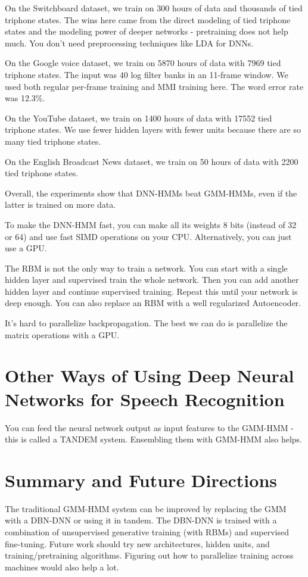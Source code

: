 \documentclass[a4paper]{article}
\begin{document}
On the Switchboard dataset, we train on 300 hours of data and thousands of
tied triphone states. The wins here came from the direct modeling of tied
triphone states and the modeling power of deeper networks - pretraining
does not help much. You don't need preprocessing techniques like LDA for DNNs.

On the Google voice dataset, we train on 5870 hours of data with 7969 tied
triphone states. The input was 40 log filter banks in an 11-frame window. We
used both regular per-frame training and MMI training here. The word error rate
was 12.3\%.

On the YouTube dataset, we train on 1400 hours of data with 17552 tied triphone
states. We use fewer hidden layers with fewer units because there are so many
tied triphone states.

On the English Broadcast News dataset, we train on 50 hours of data with 2200
tied triphone states.

Overall, the experiments show that DNN-HMMs beat GMM-HMMs, even if the latter is
trained on more data.

To make the DNN-HMM fast, you can make all its weights 8 bits (instead of 32 or
64) and use fast SIMD operations on your CPU. Alternatively, you can just use a
GPU.

The RBM is not the only way to train a network. You can start with a single
hidden layer and supervised train the whole network. Then you can add another
hidden layer and continue supervised training. Repeat this until your network
is deep enough. You can also replace an RBM with a well regularized Autoencoder.

It's hard to parallelize backpropagation. The best we can do is parallelize the
matrix operations with a GPU.

\section{Other Ways of Using Deep Neural Networks for Speech Recognition}
You can feed the neural network output as input features to the GMM-HMM - this
is called a TANDEM system. Ensembling them with GMM-HMM also helps.

\section{Summary and Future Directions}
The traditional GMM-HMM system can be improved by replacing the GMM with a 
DBN-DNN or using it in tandem. The DBN-DNN is trained with a combination of
unsupervised generative training (with RBMs) and supervised fine-tuning.
Future work should try new architectures, hidden units, and training/pretraining
algorithms. Figuring out how to parallelize training across machines would also
help a lot.
\end{document}
